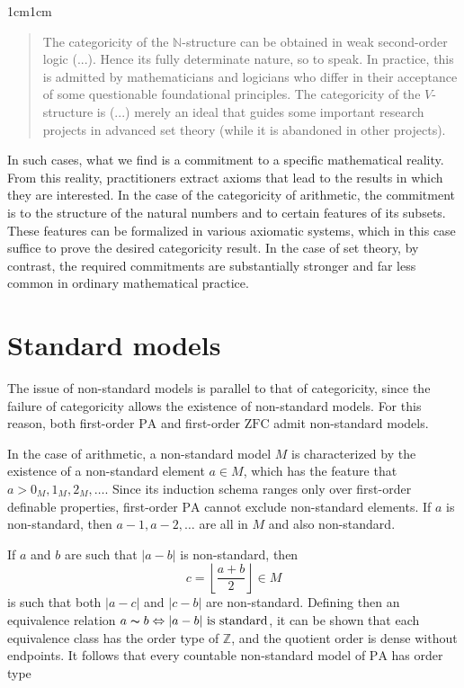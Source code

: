 \documentclass[11pt,a4paper]{article}
\theoremstyle{plain}
\begin{document}
\begin{adjustwidth}{1cm}{1cm}
\begin{quote}
\small
The categoricity of the $\mathbb{N}$-structure can be obtained in weak second-order logic (...). Hence its fully determinate nature, so to speak. In practice, this is admitted by mathematicians and logicians who differ in their acceptance of some questionable foundational principles. The categoricity of the $V$-structure is (...) merely an ideal that guides some important research projects in advanced set theory (while it is abandoned in other projects).
\end{quote}
\end{adjustwidth}

In such cases, what we find is a commitment to a specific mathematical reality. From this reality, practitioners extract axioms that lead to the results in which they are interested. In the case of the categoricity of arithmetic, the commitment is to the structure of the natural numbers and to certain features of its subsets. These features can be formalized in various axiomatic systems, which in this case suffice to prove the desired categoricity result. In the case of set theory, by contrast, the required commitments are substantially stronger and far less common in ordinary mathematical practice.

\section{Standard models}
\label{standard-models}

The issue of non-standard models is parallel to that of categoricity, since the failure of categoricity allows the existence of non-standard models. For this reason, both first-order $\mathrm{PA}$ and first-order $\mathrm{ZFC}$ admit non-standard models. 

In the case of arithmetic, a non-standard model $M$ is characterized by the existence of a non-standard element $a \in M$, which has the feature that $a > 0_M, 1_M, 2_M, \dots$. Since its induction schema ranges only over first-order definable properties, first-order  $\mathrm{PA}$ cannot exclude non-standard elements. If $a$ is non-standard, then $a-1,a-2,\dots$ are all in $M$ and also non-standard. 

If $a$ and $b$ are such that $|a-b|$ is non-standard, then $$c = \left\lfloor \frac{a+b}{2} \right\rfloor \in M $$ is such that both $|a-c|$ and $|c-b|$ are non-standard. Defining then an equivalence relation $a\thicksim b \Leftrightarrow |a-b| \text{ is standard}$, it can be shown that each equivalence class has the order type of $\mathbb{Z}$, and the quotient order is dense without endpoints. It follows that every countable non-standard model of $\mathrm{PA}$ has order type
\end{document}
